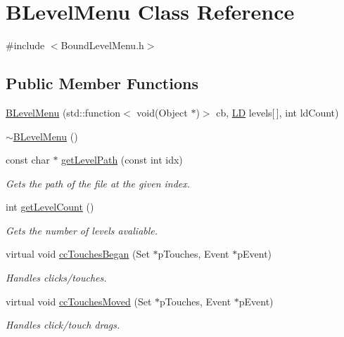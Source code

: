 \hypertarget{class_b_level_menu}{\section{\-B\-Level\-Menu \-Class \-Reference}
\label{class_b_level_menu}
}


{\ttfamily \#include $<$\-Bound\-Level\-Menu.\-h$>$}

\subsection*{\-Public \-Member \-Functions}
\begin{DoxyCompactItemize}
\item 
\hyperlink{class_b_level_menu_a0d27ff3c8303ab37a5db7e3afb99847e}{\-B\-Level\-Menu} (std\-::function$<$ void(\-Object $\ast$)$>$ cb, \hyperlink{struct_l_d}{\-L\-D} levels\mbox{[}$\,$\mbox{]}, int ld\-Count)
\item 
\hyperlink{class_b_level_menu_a4646279f37990d842a77eb2e071a3919}{$\sim$\-B\-Level\-Menu} ()
\item 
const char $\ast$ \hyperlink{class_b_level_menu_a38bfb874e8a2d32bb01f4a281032e84c}{get\-Level\-Path} (const int idx)
\begin{DoxyCompactList}\small\item\em \-Gets the path of the file at the given index. \end{DoxyCompactList}\item 
int \hyperlink{class_b_level_menu_aeb1f5dc532dab13120d309c8ca7a30b9}{get\-Level\-Count} ()
\begin{DoxyCompactList}\small\item\em \-Gets the number of levels avaliable. \end{DoxyCompactList}\item 
virtual void \hyperlink{class_b_level_menu_a3a7207f8b357ae3e82b26b3507137775}{cc\-Touches\-Began} (\-Set $\ast$p\-Touches, \-Event $\ast$p\-Event)
\begin{DoxyCompactList}\small\item\em \-Handles clicks/touches. \end{DoxyCompactList}\item 
virtual void \hyperlink{class_b_level_menu_a14fc166131531c3c9ef271eb965bfd64}{cc\-Touches\-Moved} (\-Set $\ast$p\-Touches, \-Event $\ast$p\-Event)
\begin{DoxyCompactList}\small\item\em \-Handles click/touch drags. \end{DoxyCompactList}\end{DoxyCompactItemize}



